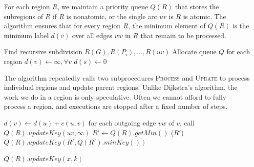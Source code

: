 \documentclass[12pt]{article}
\begin{document}
For each region $R$, we maintain a priority queue $Q(R)$ that stores the subregions of $R$ if $R$ is nonatomic, or the single arc $uv$ is $R$ is atomic. The algorithm ensures that for every region $R$, the minimum element of $Q(R)$ is the minimum label $d(v)$ over all edges $vw$ in $R$ that remain to be processed.


\begin{algorithm}
  \label{alg:linear}
  \begin{algorithmic}[1]
    \State Find recursive subdivision $R(G), R(P_i), \ldots, R(uv)$
    \State Allocate queue $Q$ for each region
    \State $d(v) \gets \infty, \forall v$
    \State $d(s) \gets 0$
      \State {}
    \EndFor
      \State {}
    \EndWhile
  \end{algorithmic}
\end{algorithm}

The algorithm repeatedly calls two subprocedures \textsc{Process} and \textsc{Update} to process individual regions and update parent regions. Unlike Dijkstra's algorithm, the work we do in a region is only speculative. Often we cannot afford to fully process a region, and executions are stopped after a fixed number of steps.

\begin{algorithm}[!h]
  \label{alg:process}
  \begin{algorithmic}[1]
          \State $d(v) \gets d(u) + c(u,v)$
          \State for each outgoing edge $vw$ of $v$, call 
        \EndIf
        \State $Q(R).updateKey(uv,\infty)$
      \Else
        \Repeat
          \State $R' \gets Q(R).getMin()$
          \State {}($R'$)
          \State $Q(R).updateKey(R',Q(R').minKey())$
      \EndIf
    \EndProcedure
  \end{algorithmic}
\end{algorithm}


\begin{algorithm}[!h]
  \label{alg:update}
  \begin{algorithmic}[1]
      \State $Q(R).updateKey(x,k)$
        \State {}
      \EndIf
    \EndProcedure
  \end{algorithmic}
\end{algorithm}
\end{document}
